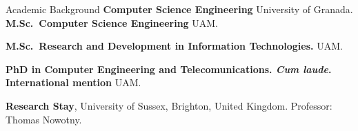 \begin{rubric}{Academic Background}
\entry*[2014 -- 2018]%
	\textbf{Computer Science Engineering} University of Granada.
%
\entry*[2018 -- 2019]%
	\textbf{M.Sc.~Computer Science Engineering} UAM.\par
\vspace{-3pt}
\entry*[2018 -- 2019]%
	\textbf{M.Sc.~Research and Development in Information Technologies.} UAM.\par
\entry*[2020 -- 2024]%
	\textbf{PhD in Computer Engineering and Telecomunications. \textit{Cum laude}. International mention} UAM.\par
    
 \textbf{Research Stay}, University of Sussex, Brighton, United Kingdom. Professor: Thomas Nowotny.

\end{rubric}